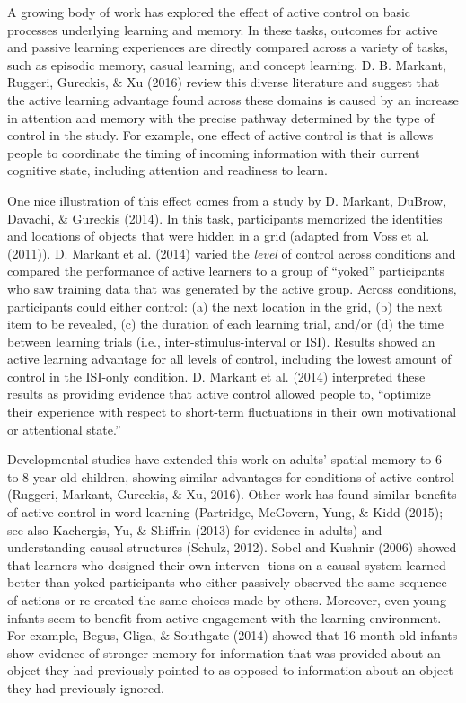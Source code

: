 \documentclass[a4paper,man,apacite,floatsintext]{apa6}
\begin{document}
A growing body of work has explored the effect of active control on
basic processes underlying learning and memory. In these tasks, outcomes
for active and passive learning experiences are directly compared across
a variety of tasks, such as episodic memory, casual learning, and
concept learning. D. B. Markant, Ruggeri, Gureckis, \& Xu (2016) review
this diverse literature and suggest that the active learning advantage
found across these domains is caused by an increase in attention and
memory with the precise pathway determined by the type of control in the
study. For example, one effect of active control is that is allows
people to coordinate the timing of incoming information with their
current cognitive state, including attention and readiness to learn.

One nice illustration of this effect comes from a study by D. Markant,
DuBrow, Davachi, \& Gureckis (2014). In this task, participants
memorized the identities and locations of objects that were hidden in a
grid (adapted from Voss et al. (2011)). D. Markant et al. (2014) varied
the \emph{level} of control across conditions and compared the
performance of active learners to a group of ``yoked'' participants who
saw training data that was generated by the active group. Across
conditions, participants could either control: (a) the next location in
the grid, (b) the next item to be revealed, (c) the duration of each
learning trial, and/or (d) the time between learning trials (i.e.,
inter-stimulus-interval or ISI). Results showed an active learning
advantage for all levels of control, including the lowest amount of
control in the ISI-only condition. D. Markant et al. (2014) interpreted
these results as providing evidence that active control allowed people
to, ``optimize their experience with respect to short-term fluctuations
in their own motivational or attentional state.''

Developmental studies have extended this work on adults' spatial memory
to 6- to 8-year old children, showing similar advantages for conditions
of active control (Ruggeri, Markant, Gureckis, \& Xu, 2016). Other work
has found similar benefits of active control in word learning
(Partridge, McGovern, Yung, \& Kidd (2015); see also Kachergis, Yu, \&
Shiffrin (2013) for evidence in adults) and understanding causal
structures (Schulz, 2012). Sobel and Kushnir (2006) showed that learners
who designed their own interven- tions on a causal system learned better
than yoked participants who either passively observed the same sequence
of actions or re-created the same choices made by others. Moreover, even
young infants seem to benefit from active engagement with the learning
environment. For example, Begus, Gliga, \& Southgate (2014) showed that
16-month-old infants show evidence of stronger memory for information
that was provided about an object they had previously pointed to as
opposed to information about an object they had previously ignored.
\end{document}
